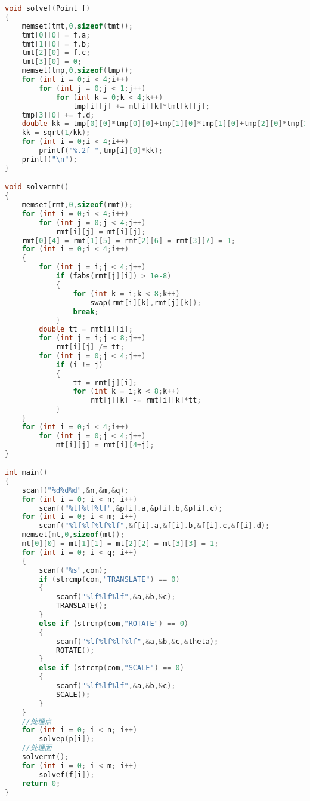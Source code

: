 \begin{lstlisting}[language=c++]
void solvef(Point f)
{
    memset(tmt,0,sizeof(tmt));
    tmt[0][0] = f.a;
    tmt[1][0] = f.b;
    tmt[2][0] = f.c;
    tmt[3][0] = 0;
    memset(tmp,0,sizeof(tmp));
    for (int i = 0;i < 4;i++)
        for (int j = 0;j < 1;j++)
            for (int k = 0;k < 4;k++)
                tmp[i][j] += mt[i][k]*tmt[k][j];
    tmp[3][0] += f.d;
    double kk = tmp[0][0]*tmp[0][0]+tmp[1][0]*tmp[1][0]+tmp[2][0]*tmp[2][0];
    kk = sqrt(1/kk);
    for (int i = 0;i < 4;i++)
        printf("%.2f ",tmp[i][0]*kk);
    printf("\n");
}

void solvermt()
{
    memset(rmt,0,sizeof(rmt));
    for (int i = 0;i < 4;i++)
        for (int j = 0;j < 4;j++)
            rmt[i][j] = mt[i][j];
    rmt[0][4] = rmt[1][5] = rmt[2][6] = rmt[3][7] = 1;
    for (int i = 0;i < 4;i++)
    {
        for (int j = i;j < 4;j++)
            if (fabs(rmt[j][i]) > 1e-8)
            {
                for (int k = i;k < 8;k++)
                    swap(rmt[i][k],rmt[j][k]);
                break;
            }
        double tt = rmt[i][i];
        for (int j = i;j < 8;j++)
            rmt[i][j] /= tt;
        for (int j = 0;j < 4;j++)
            if (i != j)
            {
                tt = rmt[j][i];
                for (int k = i;k < 8;k++)
                    rmt[j][k] -= rmt[i][k]*tt;
            }
    }
    for (int i = 0;i < 4;i++)
        for (int j = 0;j < 4;j++)
            mt[i][j] = rmt[i][4+j];
}

int main()
{
    scanf("%d%d%d",&n,&m,&q);
    for (int i = 0; i < n; i++)
        scanf("%lf%lf%lf",&p[i].a,&p[i].b,&p[i].c);
    for (int i = 0; i < m; i++)
        scanf("%lf%lf%lf%lf",&f[i].a,&f[i].b,&f[i].c,&f[i].d);
    memset(mt,0,sizeof(mt));
    mt[0][0] = mt[1][1] = mt[2][2] = mt[3][3] = 1;
    for (int i = 0; i < q; i++)
    {
        scanf("%s",com);
        if (strcmp(com,"TRANSLATE") == 0)
        {
            scanf("%lf%lf%lf",&a,&b,&c);
            TRANSLATE();
        }
        else if (strcmp(com,"ROTATE") == 0)
        {
            scanf("%lf%lf%lf%lf",&a,&b,&c,&theta);
            ROTATE();
        }
        else if (strcmp(com,"SCALE") == 0)
        {
            scanf("%lf%lf%lf",&a,&b,&c);
            SCALE();
        }
    }
	//处理点
    for (int i = 0; i < n; i++)
        solvep(p[i]);
	//处理面
    solvermt();
    for (int i = 0; i < m; i++)
        solvef(f[i]);
    return 0;
}
	\end{lstlisting}
